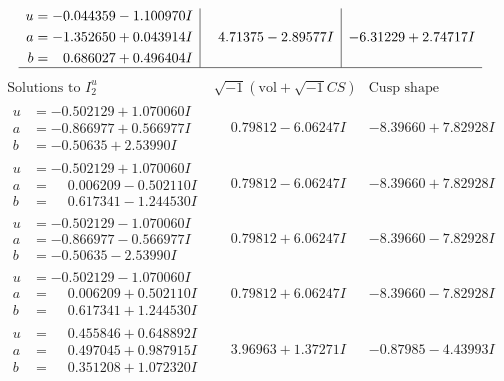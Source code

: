 \documentclass[1p]{elsarticle_modified}
\theoremstyle{definition}
\newcommand{\I}{\sqrt{-1}}
\begin{document}
$$\begin{array}{c|c|c}
\begin{aligned}
u &= -0.044359 - 1.100970 I \\
a &= -1.352650 + 0.043914 I \\
b &= \phantom{-}0.686027 + 0.496404 I\end{aligned}
 & \phantom{-}4.71375 - 2.89577 I & -6.31229 + 2.74717 I\\
 \hline 
 \end{array}$$\newpage$$\begin{array}{c|c|c}  
\text{Solutions to }I^u_{2}& \I (\text{vol} + \sqrt{-1}CS) & \text{Cusp shape}\\
 \hline 
\begin{aligned}
u &= -0.502129 + 1.070060 I \\
a &= -0.866977 + 0.566977 I \\
b &= -0.50635 + 2.53990 I\end{aligned}
 & \phantom{-}0.79812 - 6.06247 I & -8.39660 + 7.82928 I \\ \hline\begin{aligned}
u &= -0.502129 + 1.070060 I \\
a &= \phantom{-}0.006209 - 0.502110 I \\
b &= \phantom{-}0.617341 - 1.244530 I\end{aligned}
 & \phantom{-}0.79812 - 6.06247 I & -8.39660 + 7.82928 I \\ \hline\begin{aligned}
u &= -0.502129 - 1.070060 I \\
a &= -0.866977 - 0.566977 I \\
b &= -0.50635 - 2.53990 I\end{aligned}
 & \phantom{-}0.79812 + 6.06247 I & -8.39660 - 7.82928 I \\ \hline\begin{aligned}
u &= -0.502129 - 1.070060 I \\
a &= \phantom{-}0.006209 + 0.502110 I \\
b &= \phantom{-}0.617341 + 1.244530 I\end{aligned}
 & \phantom{-}0.79812 + 6.06247 I & -8.39660 - 7.82928 I \\ \hline\begin{aligned}
u &= \phantom{-}0.455846 + 0.648892 I \\
a &= \phantom{-}0.497045 + 0.987915 I \\
b &= \phantom{-}0.351208 + 1.072320 I\end{aligned}
 & \phantom{-}3.96963 + 1.37271 I & -0.87985 - 4.43993 I \\ \hline\begin{aligned}

\end{aligned}
\end{array}$$
\end{document}
